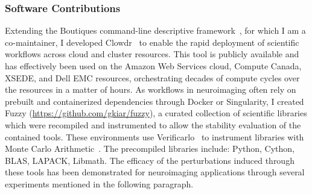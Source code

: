 \subsubsection*{Software Contributions}
Extending the Boutiques command-line descriptive framework~\cite{Glatard2018-tu}, for which I am a co-maintainer, I
developed Clowdr~\cite{Kiar2019-sr} to enable the rapid deployment of scientific workflows across cloud and cluster
resources. This tool is publicly available and has effectively been used on the Amazon Web Services cloud, Compute
Canada, XSEDE, and Dell  EMC resources, orchestrating decades of compute cycles over the resources in a matter of
hours. As workflows in neuroimaging often rely on prebuilt and containerized dependencies through Docker or
Singularity, I created Fuzzy (\href{https://github.com/gkiar/fuzzy}{https://github.com/gkiar/fuzzy}), a curated
collection of scientific libraries which were recompiled and instrumented to allow the stability evaluation of the
contained tools. These environments use Verificarlo~\cite{Denis2016-wo} to instrument libraries with Monte Carlo
Arithmetic~\cite{Parker1997-qq}. The precompiled libraries include: Python, Cython, BLAS, LAPACK, Libmath. The efficacy
of the perturbations induced through these tools has been demonstrated for neuroimaging applications through several
experiments mentioned in the following paragraph.

